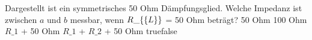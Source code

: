     {Dargestellt ist ein symmetrisches 50 Ohm Dämpfungsglied. Welche Impedanz ist zwischen $a$ und $b$ messbar, wenn $R\_\{\textrm\{L\}\}$ = 50 Ohm beträgt?}
    {50 Ohm}
    {100 Ohm}
    {$R\_1$ + 50 Ohm}
    {$R\_1$ + $R\_2$ + 50 Ohm}
    {true}{false}